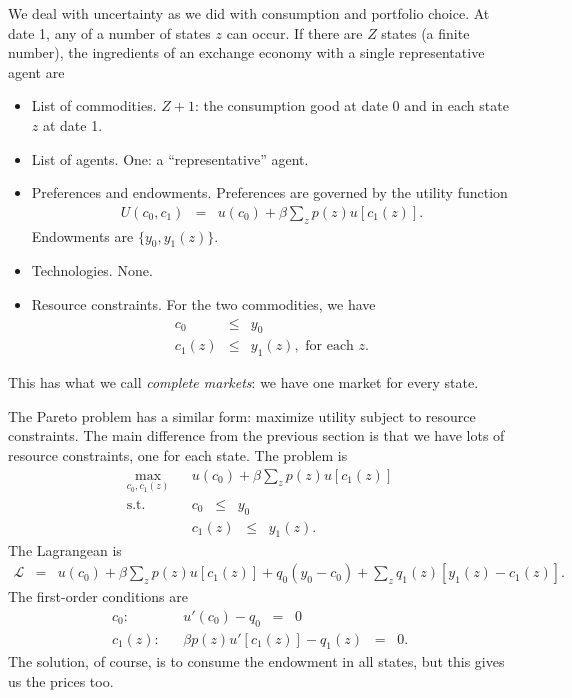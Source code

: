 \documentclass[11pt]{article}
\begin{document}
We deal with uncertainty as we did with consumption and portfolio choice.
At date 1, any of a number of states $z$ can occur.
If there are $Z$ states (a finite number), the ingredients of
an exchange economy with a single representative agent are
\begin{itemize}
\item List of commodities.  $Z+1$:  the consumption good at date 0
and in each state $z$ at date 1.
\item List of agents.  One: a ``representative'' agent.
\item Preferences and endowments.  Preferences are governed by the utility function
\begin{eqnarray*}
    U(c_0,c_1) &=& u(c_0) + \beta \sum_z p(z) u[c_1(z)] .
\end{eqnarray*}
Endowments are $\{y_0,y_1(z)\}$.
\item Technologies.  None.
\item Resource constraints.  For the two commodities,
we have
\begin{eqnarray*}
    c_0 &\leq& y_0 \\
    c_1(z) &\leq& y_1(z), \mbox{ for each } z .
\end{eqnarray*}
\end{itemize}
This has what we call {\it complete markets\/}:  we have one market for every state.

The Pareto problem has a similar form:  maximize utility subject to
resource constraints.
The main difference from the previous section is that we have lots of resource
constraints, one for each state.
The problem is
\begin{eqnarray*}
    \max_{c_0,c_1(z)} && u(c_0) + \beta \sum_z p(z) u[c_1(z)] \\
    \mbox{s.t.}   &&  c_0  \;\;\leq\;\; y_0 \\
                  &&  c_1(z) \;\;\leq\;\; y_1(z) .
\end{eqnarray*}
The Lagrangean is
\begin{eqnarray*}
    \mathcal{L} &=&  u(c_0) + \beta \sum_z p(z) u[c_1(z)] + q_0 (y_0 - c_0)
                    + \sum_z q_1(z)  [ y_1(z) - c_1(z)]  .
\end{eqnarray*}
The first-order conditions are
\begin{eqnarray*}
    c_0: &&  u'(c_0) - q_0 \;\;=\;\; 0 \\
    c_1(z): &&  \beta p(z) u'[c_1(z)] - q_1(z) \;\;=\;\; 0 .
\end{eqnarray*}
The solution, of course, is to consume the endowment in all states,
but this gives us the prices too.
\end{document}
